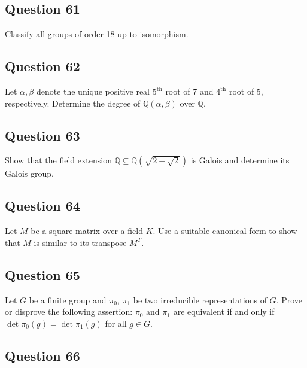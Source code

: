 \documentclass[12pt]{article}
\begin{document}
\hypertarget{question-61}{%
\subsection{Question 61}\label{question-61}}

Classify all groups of order 18 up to isomorphism.

\hypertarget{question-62}{%
\subsection{Question 62}\label{question-62}}

Let \(\alpha,\beta\) denote the unique positive real \(5^{\text{th}}\)
root of 7 and \(4^{\text{th}}\) root of 5, respectively. Determine the
degree of \(\mathbb Q(\alpha,\beta)\) over \(\mathbb Q\).

\hypertarget{question-63}{%
\subsection{Question 63}\label{question-63}}

Show that the field extension
\(\mathbb Q\subseteq\mathbb Q\left( \sqrt{2+\sqrt2}\right)\) is Galois
and determine its Galois group.

\hypertarget{question-64}{%
\subsection{Question 64}\label{question-64}}

Let \(M\) be a square matrix over a field \(K\). Use a suitable
canonical form to show that \(M\) is similar to its transpose \(M^T\).

\hypertarget{question-65}{%
\subsection{Question 65}\label{question-65}}

Let \(G\) be a finite group and \(\pi_0\), \(\pi_1\) be two irreducible
representations of \(G\). Prove or disprove the following assertion:
\(\pi_0\) and \(\pi_1\) are equivalent if and only if
\(\det\pi_0(g)=\det\pi_1(g)\) for all \(g\in G\).

\hypertarget{question-66}{%
\subsection{Question 66}\label{question-66}}
\end{document}
